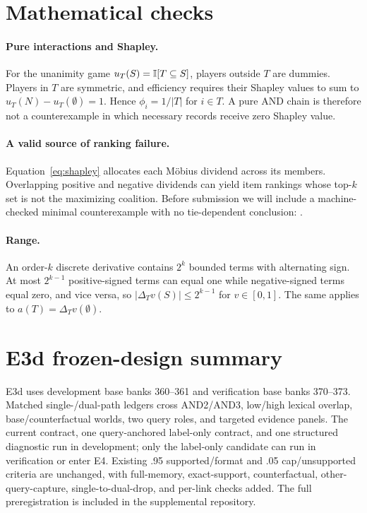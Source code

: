 \section{Mathematical checks}
\label{app:math}

\paragraph{Pure interactions and Shapley.}
For the unanimity game \(u_T(S)=\mathbb{I}[T\subseteq S]\), players outside \(T\) are
dummies. Players in \(T\) are symmetric, and efficiency requires their Shapley
values to sum to \(u_T(N)-u_T(\emptyset)=1\). Hence
\(\phi_i=1/|T|\) for \(i\in T\). A pure AND chain is therefore not a
counterexample in which necessary records receive zero Shapley value.

\paragraph{A valid source of ranking failure.}
Equation~\ref{eq:shapley} allocates each M\"obius dividend across its members.
Overlapping positive and negative dividends can yield item rankings whose top-\(k\)
set is not the maximizing coalition. Before submission we will include a
machine-checked minimal counterexample with no tie-dependent conclusion:
.

\paragraph{Range.}
An order-\(k\) discrete derivative contains \(2^k\) bounded terms with alternating
sign. At most \(2^{k-1}\) positive-signed terms can equal one while negative-signed
terms equal zero, and vice versa, so
\(|\Delta_Tv(S)|\le2^{k-1}\) for \(v\in[0,1]\). The same applies to
\(a(T)=\Delta_Tv(\emptyset)\).

\section{E3d frozen-design summary}
\label{app:e3d}

E3d uses development base banks 360--361 and verification base banks 370--373.
Matched single-/dual-path ledgers cross AND2/AND3, low/high lexical overlap,
base/counterfactual worlds, two query roles, and targeted evidence panels. The
current contract, one query-anchored label-only contract, and one structured
diagnostic run in development; only the label-only candidate can run in
verification or enter E4. Existing .95 supported/format and .05 cap/unsupported
criteria are unchanged, with full-memory, exact-support, counterfactual,
other-query-capture, single-to-dual-drop, and per-link checks added. The full
preregistration is included in the supplemental repository.

